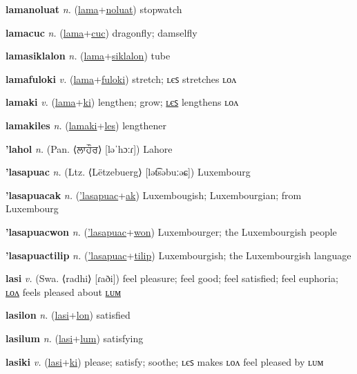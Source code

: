 \textbf{\hypertarget{lamanoluat}{lamanoluat}} \textit{n.} (\hyperlink{lama}{lama}+\allowbreak \hyperlink{noluat}{noluat})
stopwatch

\textbf{\hypertarget{lamacuc}{lamacuc}} \textit{n.} (\hyperlink{lama}{lama}+\allowbreak \hyperlink{cuc}{cuc})
dragonfly; damselfly

\textbf{\hypertarget{lamasiklalon}{lamasiklalon}} \textit{n.} (\hyperlink{lama}{lama}+\allowbreak \hyperlink{siklalon}{siklalon})
tube

\textbf{\hypertarget{lamafuloki}{lamafuloki}} \textit{v.} (\hyperlink{lama}{lama}+\allowbreak \hyperlink{fuloki}{fuloki})
stretch; ʟєꜱ stretches ʟᴏᴧ

\textbf{\hypertarget{lamaki}{lamaki}} \textit{v.} (\hyperlink{lama}{lama}+\allowbreak \hyperlink{ki}{ki})
lengthen; grow; \hyperlink{lamakiles}{ʟєꜱ} lengthens ʟᴏᴧ

\textbf{\hypertarget{lamakiles}{lamakiles}} \textit{n.} (\hyperlink{lamaki}{lamaki}+\allowbreak \hyperlink{les}{les})
lengthener

\textbf{\hypertarget{'lahol}{'lahol}} \textit{n.} (Pan. ⟨{\gurmukhi{}ਲਾਹੌਰ}⟩ [ləˈhɔːɾ])
Lahore

\textbf{\hypertarget{'lasapuac}{'lasapuac}} \textit{n.} (Ltz. ⟨Lëtzebuerg⟩ [lət͡səbuːəɕ])
Luxembourg

\textbf{\hypertarget{'lasapuacak}{'lasapuacak}} \textit{n.} (\hyperlink{'lasapuac}{'lasapuac}+\allowbreak \hyperlink{ak}{ak})
Luxembougish; Luxembourgian; from Luxembourg

\textbf{\hypertarget{'lasapuacwon}{'lasapuacwon}} \textit{n.} (\hyperlink{'lasapuac}{'lasapuac}+\allowbreak \hyperlink{won}{won})
Luxembourger; the Luxembourgish people

\textbf{\hypertarget{'lasapuactilip}{'lasapuactilip}} \textit{n.} (\hyperlink{'lasapuac}{'lasapuac}+\allowbreak \hyperlink{tilip}{tilip})
Luxembourgish; the Luxembourgish language

\textbf{\hypertarget{lasi}{lasi}} \textit{v.} (Swa. ⟨radhi⟩ [ɾaði])
feel pleasure; feel good; feel satisfied; feel euphoria; \hyperlink{lasilon}{ʟᴏᴧ} feels pleased about \hyperlink{lasilum}{ʟᴜᴍ}

\textbf{\hypertarget{lasilon}{lasilon}} \textit{n.} (\hyperlink{lasi}{lasi}+\allowbreak \hyperlink{lon}{lon})
satisfied

\textbf{\hypertarget{lasilum}{lasilum}} \textit{n.} (\hyperlink{lasi}{lasi}+\allowbreak \hyperlink{lum}{lum})
satisfying

\textbf{\hypertarget{lasiki}{lasiki}} \textit{v.} (\hyperlink{lasi}{lasi}+\allowbreak \hyperlink{ki}{ki})
please; satisfy; soothe; ʟєꜱ makes ʟᴏᴧ feel pleased by ʟᴜᴍ


